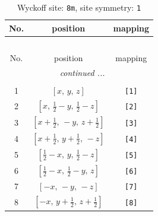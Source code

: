 \documentclass[fleqn,8pt]{jsarticle}
\begin{document}
\renewcommand{\arraystretch}{1.2}
\begin{longtable}{ccc}
\caption{Wyckoff site: {\tt 8m}, site symmetry: {\tt 1}}
 \\
 \hline \hline
No. & position & mapping \\ \hline \endfirsthead

\multicolumn{2}{l}{\tablename\ \thetable{}} \\
 \hline \hline
No. & position & mapping \\ \hline \endhead

 \hline \hline
\multicolumn{2}{r}{\footnotesize\it continued ...} \\ \endfoot

 \hline \hline
\multicolumn{2}{r}{} \\ \endlastfoot

1 & $\left[ x,\, y,\, z \right]$ & {\tt [1]} \\ \hline
2 & $\left[ x,\, \frac{1}{2} - y,\, \frac{1}{2} - z \right]$ & {\tt [2]} \\ \hline
3 & $\left[ x + \frac{1}{2},\, - y,\, z + \frac{1}{2} \right]$ & {\tt [3]} \\ \hline
4 & $\left[ x + \frac{1}{2},\, y + \frac{1}{2},\, - z \right]$ & {\tt [4]} \\ \hline
5 & $\left[ \frac{1}{2} - x,\, y,\, \frac{1}{2} - z \right]$ & {\tt [5]} \\ \hline
6 & $\left[ \frac{1}{2} - x,\, \frac{1}{2} - y,\, z \right]$ & {\tt [6]} \\ \hline
7 & $\left[ - x,\, - y,\, - z \right]$ & {\tt [7]} \\ \hline
8 & $\left[ - x,\, y + \frac{1}{2},\, z + \frac{1}{2} \right]$ & {\tt [8]} \\
\end{longtable}
\end{document}
